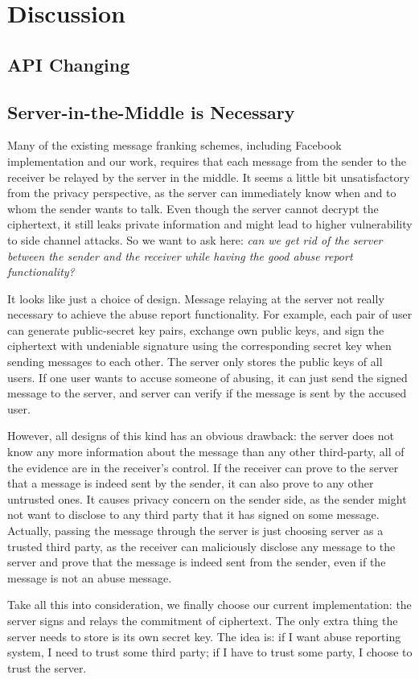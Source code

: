 
\section{Discussion}
\subsection{API Changing}

\subsection{Server-in-the-Middle is Necessary}
Many of the existing message franking schemes,
including Facebook implementation and our work,
requires that each message from the sender to the receiver be relayed by the server in the middle.
It seems a little bit unsatisfactory from the privacy perspective,
as the server can immediately know when and to whom the sender wants to talk.
Even though the server cannot decrypt the ciphertext,
it still leaks private information and might lead to higher vulnerability to side channel attacks.
So we want to ask here: \emph{can we get rid of the server between the sender and the receiver while having the good abuse report functionality?}

It looks like just a choice of design.
Message relaying at the server not really necessary to achieve the abuse report functionality.
For example, each pair of user can generate public-secret key pairs, exchange own public keys,
and sign the ciphertext with undeniable signature using the corresponding secret key when sending messages to each other.
The server only stores the public keys of all users.
If one user wants to accuse someone of abusing, it can just send the signed message to the server,
and server can verify if the message is sent by the accused user.

However, all designs of this kind has an obvious drawback:
the server does not know any more information about the message than any other third-party,
all of the evidence are in the receiver's control. 
If the receiver can prove to the server that a message is indeed sent by the sender,
it can also prove to any other untrusted ones.
It causes privacy concern on the sender side, 
as the sender might not want to disclose to any third party that it has signed on some message.
Actually, passing the message through the server
is just choosing server as a trusted third party,
as the receiver can maliciously disclose any message to the server and prove that the message is indeed sent from the sender,
even if the message is not an abuse message.


Take all this into consideration, we finally choose our current implementation:
the server signs and relays the commitment of ciphertext.
The only extra thing the server needs to store is its own secret key.
The idea is: if I want abuse reporting system, I need to trust some third party;
if I have to trust some party, I choose to trust the server.

\subsection{}